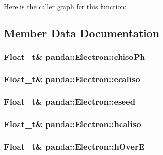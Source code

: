 Here is the caller graph for this function:

\subsection{Member Data Documentation}
\hypertarget{classpanda_1_1Electron_a45c4dfccb2afa82a251c18019275cd59}{
\subsubsection[{chisoPh}]{\setlength{\rightskip}{0pt plus 5cm}Float\_\-t\& {\bf panda::Electron::chisoPh}}}
\label{classpanda_1_1Electron_a45c4dfccb2afa82a251c18019275cd59}
\hypertarget{classpanda_1_1Electron_a67e15ea6d6a8ad9ca9123fb50e095241}{
\subsubsection[{ecaliso}]{\setlength{\rightskip}{0pt plus 5cm}Float\_\-t\& {\bf panda::Electron::ecaliso}}}
\label{classpanda_1_1Electron_a67e15ea6d6a8ad9ca9123fb50e095241}
\hypertarget{classpanda_1_1Electron_aa3cf96c4368cde3a6ecfe55905b456f7}{
\subsubsection[{eseed}]{\setlength{\rightskip}{0pt plus 5cm}Float\_\-t\& {\bf panda::Electron::eseed}}}
\label{classpanda_1_1Electron_aa3cf96c4368cde3a6ecfe55905b456f7}
\hypertarget{classpanda_1_1Electron_ab2ef27643d09d31cefac59c900a32c80}{
\subsubsection[{hcaliso}]{\setlength{\rightskip}{0pt plus 5cm}Float\_\-t\& {\bf panda::Electron::hcaliso}}}
\label{classpanda_1_1Electron_ab2ef27643d09d31cefac59c900a32c80}
\hypertarget{classpanda_1_1Electron_a1a6590866278504775ef609cde68e171}{
\subsubsection[{hOverE}]{\setlength{\rightskip}{0pt plus 5cm}Float\_\-t\& {\bf panda::Electron::hOverE}}}
